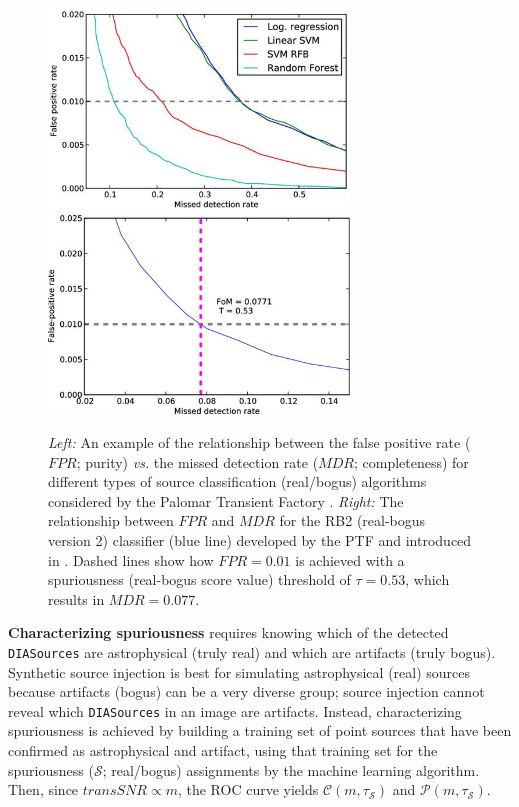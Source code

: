 \begin{figure}
\begin{center}
\includegraphics[width=8cm,trim={0cm 0cm 0cm 0cm}, clip]{figures/Brink_etal_2013_Fig3.jpg}
\includegraphics[width=8cm,trim={0cm 0cm 0cm 0cm}, clip]{figures/Brink_etal_2013_Fig7.jpg}
\caption{{\it Left:} An example of the relationship between the false positive rate ($\mathit{FPR}$; purity) {\it vs.} the missed detection rate ($\mathit{MDR}$; completeness) for different types of source classification (real/bogus) algorithms considered by the Palomar Transient Factory \citep{2013MNRAS.435.1047B}. {\it Right:} The relationship between $\mathit{FPR}$ and $\mathit{MDR}$ for the RB2 (real-bogus version 2) classifier (blue line) developed by the PTF and introduced in \cite{2013MNRAS.435.1047B}. Dashed lines show how $\mathit{FPR}=0.01$ is achieved with a spuriousness (real-bogus score value) threshold of $\tau=0.53$, which results in $\mathit{MDR}=0.077$. \label{fig:comp_pure}}
\end{center}
\end{figure}

{\bf Characterizing spuriousness} requires knowing which of the detected {\tt DIASources} are astrophysical (truly real) and which are artifacts (truly bogus).
Synthetic source injection is best for simulating astrophysical (real) sources because artifacts (bogus) can be a very diverse group; source injection cannot reveal which {\tt DIASources} in an image are artifacts.
Instead, characterizing spuriousness is achieved by building a training set of point sources that have been confirmed as astrophysical and artifact, using that training set for the spuriousness ($\mathcal{S}$; real/bogus) assignments by the machine learning algorithm.
Then, since ${transSNR}\propto m$, the ROC curve yields $\mathcal{C}(m,\tau_{\mathcal{S}})$ and $\mathcal{P}(m,\tau_{\mathcal{S}})$.

